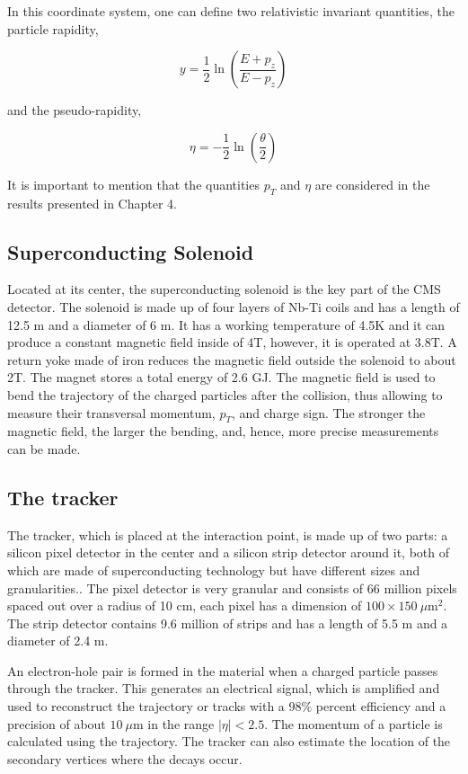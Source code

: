 In this coordinate system, one can define two relativistic invariant quantities, the particle rapidity,

\begin{equation}
y = \frac{1}{2}\ln\left(\frac{E+p_z}{E-p_z}\right)
\end{equation}

and the pseudo-rapidity,

\begin{equation}
\eta = -\frac{1}{2}\ln\left(\frac{\theta}{2}\right)
\end{equation}

It is important to mention that the quantities $p_T$ and $\eta$ are considered in the results presented in Chapter 4.

\subsection{Superconducting Solenoid}
Located at its center, the superconducting solenoid is the key part of the CMS detector. The solenoid is made up of four layers of Nb-Ti coils and has a length of 12.5 m and a diameter of 6 m. It has a working temperature of 4.5K and it can produce a constant magnetic field inside of 4T, however, it is operated at 3.8T. A return yoke made of iron reduces the magnetic field outside the solenoid to about 2T. The magnet stores a total energy of 2.6 GJ. The magnetic field is used to bend the trajectory of the charged particles after the collision, thus allowing to measure their transversal momentum, $p_T$, and charge sign. The stronger the magnetic field, the larger the bending, and, hence, more precise measurements can be made.
\subsection{The tracker}
The tracker, which is placed at the interaction point, is made up of two parts: a silicon pixel detector in the center and a silicon strip detector around it, both of which are made of superconducting technology but have different sizes and granularities.\cite{sanchez2020search}. The pixel detector is very granular and consists of 66 million pixels spaced out over a radius of 10 cm, each pixel has a dimension of $100 \times 150 \ \mu \text{m}^2$. The strip detector contains 9.6 million of strips and has a length of 5.5 m and a diameter of 2.4 m.

An electron-hole pair is formed in the material when a charged particle passes through the tracker. This generates an electrical signal, which is amplified and used to reconstruct the trajectory or tracks with a 98$\%$ percent efficiency and a precision of about $10 \ \mu$m in the range $|\eta| < 2.5$. The momentum of a particle is calculated using the trajectory. The tracker can also estimate the location of the secondary vertices where the decays occur.
